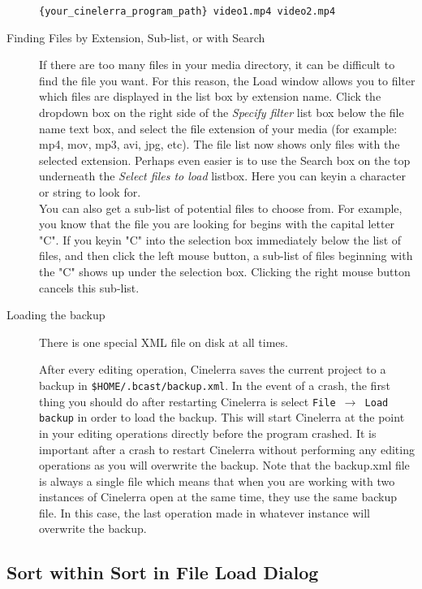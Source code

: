 \begin{description}
    \texttt{\{your\_cinelerra\_program\_path\} video1.mp4 video2.mp4}
    \item[Finding Files by Extension, Sub-list, or with Search] If there are too many files in your media directory, it can be difficult to find the file you want. For this reason, the Load window allows you to filter which files are displayed in the list box by extension name. Click the dropdown box on the right side of the \textit{Specify filter} list box below the file name text box, and select the file extension of your media (for example: mp4, mov, mp3, avi, jpg, etc). The file list now shows only files with the selected extension.  Perhaps even easier is to use the Search box on the top underneath the \textit{Select files to load} listbox.  Here you can keyin a character or string to look for. \\
    You can also get a sub-list of potential files to choose from. For example, you know that the file you are looking for begins with the capital letter "C". If you keyin "C" into the selection box immediately below the list of files, and then click the left mouse button, a sub-list of files beginning with the "C" shows up under the selection box. Clicking the right mouse button cancels this sub-list.
    \item[Loading the backup] There is one special XML file on disk at all times. 

        After every editing operation, Cinelerra saves the current project to a backup in  \texttt{\$HOME/.bcast/backup.xml}. 
        In the event of a crash, the first thing you should do after restarting Cinelerra is select \texttt{File $\rightarrow$ Load backup} in order to load the backup. 
        This will start Cinelerra at the point in your editing operations directly before the program crashed. 
        It is important after a crash to restart Cinelerra without performing any editing operations as you will overwrite the backup. 
        Note that the backup.xml file is always a single file which means that when you are working with two instances of Cinelerra open at the same time, they use the same backup file. 
        In this case, the last operation made in whatever instance will overwrite the backup.
\end{description}

\subsection{Sort within Sort in File Load Dialog}%
\label{sub:sort_within_sort_file_load_dialog}

